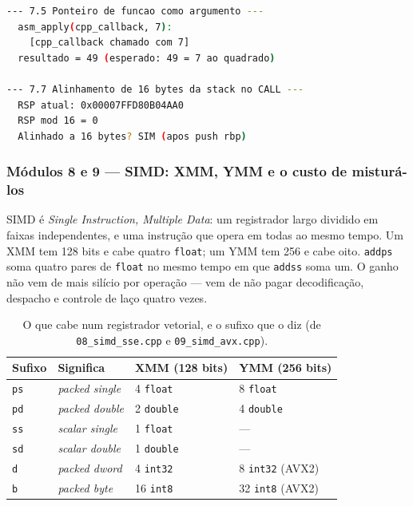 \begin{lstlisting}[style=bt, language=bash,
    caption={Saída medida de \texttt{dist/bin/asm\_07\_calling\_conv} depois da
             correção: o \emph{callback} em C++ agora retorna.}]
--- 7.5 Ponteiro de funcao como argumento ---
  asm_apply(cpp_callback, 7):
    [cpp_callback chamado com 7]
  resultado = 49 (esperado: 49 = 7 ao quadrado)

--- 7.7 Alinhamento de 16 bytes da stack no CALL ---
  RSP atual: 0x00007FFD80B04AA0
  RSP mod 16 = 0
  Alinhado a 16 bytes? SIM (apos push rbp)
\end{lstlisting}

\subsubsection{Módulos 8 e 9 --- SIMD: XMM, YMM e o custo de misturá-los}

\begin{porque}
SIMD é \emph{Single Instruction, Multiple Data}: um registrador largo dividido
em faixas independentes, e uma instrução que opera em todas ao mesmo tempo. Um
XMM tem 128 bits e cabe quatro \texttt{float}; um YMM tem 256 e cabe oito.
\texttt{addps} soma quatro pares de \texttt{float} no mesmo tempo em que
\texttt{addss} soma um. O ganho não vem de mais silício por operação --- vem de
não pagar decodificação, despacho e controle de laço quatro vezes.
\end{porque}

\begin{table}[htbp]
\centering
\caption{O que cabe num registrador vetorial, e o sufixo que o diz
         (de \texttt{08\_simd\_sse.cpp} e \texttt{09\_simd\_avx.cpp}).}
\label{tab:simd-lanes}
\footnotesize
\begin{tabular}{@{}llll@{}}
\toprule
\textbf{Sufixo} & \textbf{Significa} & \textbf{XMM (128 bits)} & \textbf{YMM (256 bits)} \\
\midrule
\texttt{ps} & \emph{packed single} & 4 \texttt{float}  & 8 \texttt{float} \\
\texttt{pd} & \emph{packed double} & 2 \texttt{double} & 4 \texttt{double} \\
\texttt{ss} & \emph{scalar single} & 1 \texttt{float}  & --- \\
\texttt{sd} & \emph{scalar double} & 1 \texttt{double} & --- \\
\texttt{d}  & \emph{packed dword}  & 4 \texttt{int32}  & 8 \texttt{int32} (AVX2) \\
\texttt{b}  & \emph{packed byte}   & 16 \texttt{int8}  & 32 \texttt{int8} (AVX2) \\
\bottomrule
\end{tabular}
\end{table}


